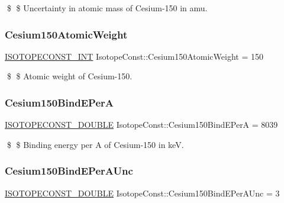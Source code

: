 \$ \$ Uncertainty in atomic mass of Cesium-\/150 in amu. \mbox{\label{group___isotope_const-_cesium-_cs150_gaefa737b1282f60019a7c12ed3f4a342e}} 
\subsubsection{\texorpdfstring{Cesium150\+Atomic\+Weight}{Cesium150AtomicWeight}}
{\footnotesize\ttfamily \mbox{\hyperlink{group___isotope_const-_macros_ga5f18360b3e99483a35c32d789e62621c}{I\+S\+O\+T\+O\+P\+E\+C\+O\+N\+S\+T\+\_\+\+I\+NT}} Isotope\+Const\+::\+Cesium150\+Atomic\+Weight = 150}

\$ \$ Atomic weight of Cesium-\/150. \mbox{\label{group___isotope_const-_cesium-_cs150_ga7cce3975c9f1c15e2ecf86c96e643c2a}} 
\subsubsection{\texorpdfstring{Cesium150\+Bind\+E\+PerA}{Cesium150BindEPerA}}
{\footnotesize\ttfamily \mbox{\hyperlink{group___isotope_const-_macros_ga8f45a7272ce02c0b4c65c44636ed719a}{I\+S\+O\+T\+O\+P\+E\+C\+O\+N\+S\+T\+\_\+\+D\+O\+U\+B\+LE}} Isotope\+Const\+::\+Cesium150\+Bind\+E\+PerA = 8039}

\$ \$ Binding energy per A of Cesium-\/150 in keV. \mbox{\label{group___isotope_const-_cesium-_cs150_ga0d85046e8aa27880ce8c24b69b7220b8}} 
\subsubsection{\texorpdfstring{Cesium150\+Bind\+E\+Per\+A\+Unc}{Cesium150BindEPerAUnc}}
{\footnotesize\ttfamily \mbox{\hyperlink{group___isotope_const-_macros_ga8f45a7272ce02c0b4c65c44636ed719a}{I\+S\+O\+T\+O\+P\+E\+C\+O\+N\+S\+T\+\_\+\+D\+O\+U\+B\+LE}} Isotope\+Const\+::\+Cesium150\+Bind\+E\+Per\+A\+Unc = 3}

